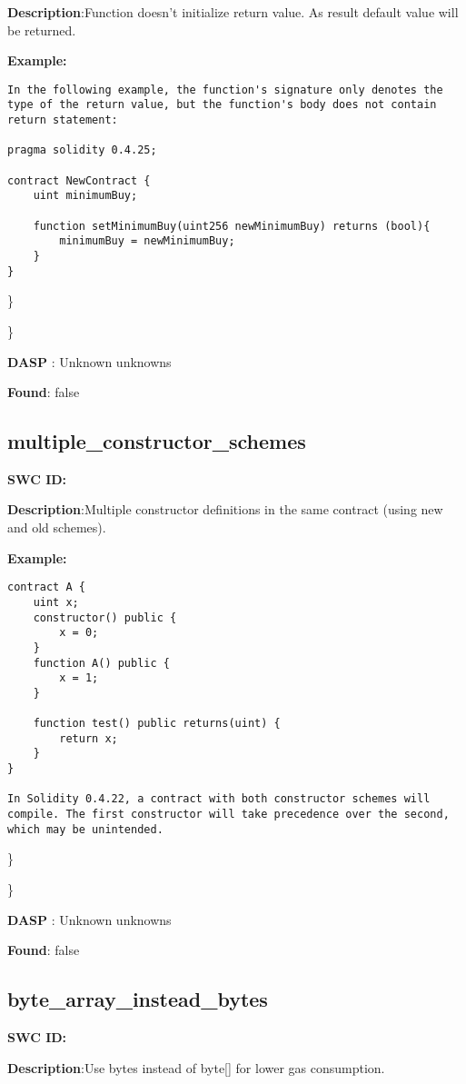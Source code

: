 \documentclass{article}
\begin{document}
\textbf{Description}:Function doesn't initialize return value. As result default value will be returned.


\textbf{Example:} 
\begin{verbatim}
In the following example, the function's signature only denotes the type of the return value, but the function's body does not contain return statement:

pragma solidity 0.4.25;

contract NewContract {
    uint minimumBuy;

    function setMinimumBuy(uint256 newMinimumBuy) returns (bool){
        minimumBuy = newMinimumBuy;
    }
}

\end{verbatim}\} 

\} 

\textbf{DASP} : Unknown unknowns

\textbf{Found}: false

\subsection{multiple\_constructor\_schemes} 
\textbf{SWC \textunderscore ID:} 

\textbf{Description}:Multiple constructor definitions in the same contract (using new and old schemes).


\textbf{Example:} 
\begin{verbatim}
contract A {
    uint x;
    constructor() public {
        x = 0;
    }
    function A() public {
        x = 1;
    }

    function test() public returns(uint) {
        return x;
    }
}

In Solidity 0.4.22, a contract with both constructor schemes will compile. The first constructor will take precedence over the second, which may be unintended.

\end{verbatim}\} 

\} 

\textbf{DASP} : Unknown unknowns

\textbf{Found}: false

\subsection{byte\_array\_instead\_bytes} 
\textbf{SWC \textunderscore ID:} 

\textbf{Description}:Use bytes instead of byte[] for lower gas consumption.
\end{document}
